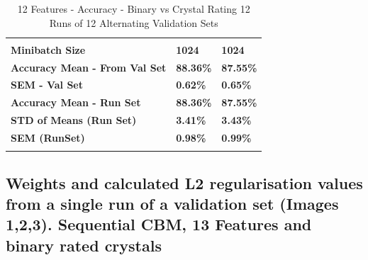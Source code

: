 \begin{longtable}[c]{@{}lll@{}}
  \cellcolor[HTML]{FCE4D6}{\color[HTML]{202124} \textbf{10\textasciicircum{}-3}} \\
\textbf{Minibatch Size} &
  \cellcolor[HTML]{FFE699}\textbf{1024} &
  \cellcolor[HTML]{FCE4D6}\textbf{1024} \\
\textbf{Accuracy Mean   - From Val Set} &
  \cellcolor[HTML]{FFE699}\textbf{88.36\%} &
  \cellcolor[HTML]{FCE4D6}\textbf{87.55\%} \\
\textbf{SEM - Val Set} &
  \cellcolor[HTML]{FFE699}\textbf{0.62\%} &
  \cellcolor[HTML]{FCE4D6}\textbf{0.65\%} \\
\textbf{Accuracy Mean   - Run Set} &
  \cellcolor[HTML]{FFE699}\textbf{88.36\%} &
  \cellcolor[HTML]{FCE4D6}\textbf{87.55\%} \\
\textbf{STD of Means (Run Set)} &
  \cellcolor[HTML]{FFE699}\textbf{3.41\%} &
  \cellcolor[HTML]{FCE4D6}\textbf{3.43\%} \\
\textbf{SEM (RunSet)} &
  \cellcolor[HTML]{FFE699}\textbf{0.98\%} &
  \cellcolor[HTML]{FCE4D6}\textbf{0.99\%}
  \\
\caption{12 Features - Accuracy - Binary vs Crystal Rating 12 Runs of 12 Alternating Validation Sets}
\label{12 Features - Accuracy - Binary vs Crystal Rating 12 Runs of 12 Alternating Validation Sets}\\
\end{longtable}


\subsection{Weights and calculated L2 regularisation values from a single run of a validation set (Images 1,2,3). Sequential CBM, 13 Features and binary rated crystals} \label{Weights and calculated L2 regularisation values from a single run of a validation set (Images 1,2,3). Sequential CBM, 13 Features and binary rated crystals}

